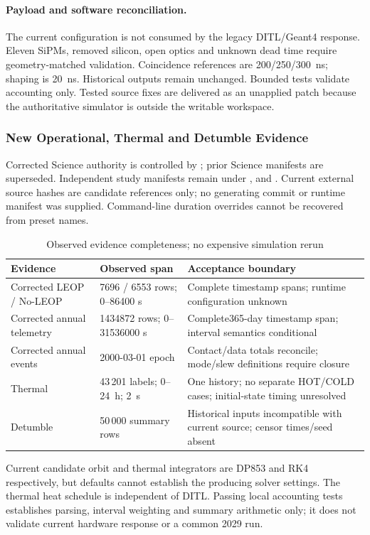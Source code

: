 \paragraph{Payload and software reconciliation.}
The current configuration is not consumed by the legacy DITL/Geant4 response. Eleven SiPMs, removed silicon, open optics and unknown dead time require geometry-matched validation. Coincidence references are 200/250/300~ns; shaping is 20~ns. Historical outputs remain unchanged. Bounded tests validate accounting only. Tested source fixes are delivered as an unapplied patch because the authoritative simulator is outside the writable workspace.

\subsubsection{New Operational, Thermal and Detumble Evidence}\label{app:new-run-identities}
Corrected Science authority is controlled by ; prior Science manifests are superseded. Independent study manifests remain under ,  and . Current external source hashes are candidate references only; no generating commit or runtime manifest was supplied. Command-line duration overrides cannot be recovered from preset names.
\begin{table}[H]\centering\small
\caption{Observed evidence completeness; no expensive simulation rerun}\label{tab:new-run-completeness}
\begin{tabularx}{\linewidth}{@{}p{3cm}p{3.1cm}X@{}}\toprule
Evidence & Observed span & Acceptance boundary\\\midrule
Corrected LEOP / No-LEOP & 7696 / 6553 rows; 0--86400 s & Complete timestamp spans; runtime configuration unknown\\
Corrected annual telemetry & 1434872 rows; 0--31536000 s & Complete365-day timestamp span; interval semantics conditional\\
Corrected annual events & 2000-03-01 epoch & Contact/data totals reconcile; mode/slew definitions require closure\\
Thermal & 43\,201 labels; 0--24~h; 2~s & One history; no separate HOT/COLD cases; initial-state timing unresolved\\
Detumble & 50\,000 summary rows & Historical inputs incompatible with current source; censor times/seed absent\\\bottomrule
\end{tabularx}\end{table}
Current candidate orbit and thermal integrators are DP853 and RK4 respectively, but defaults cannot establish the producing solver settings. The thermal heat schedule is independent of DITL. Passing local accounting tests establishes parsing, interval weighting and summary arithmetic only; it does not validate current hardware response or a common 2029 run.

